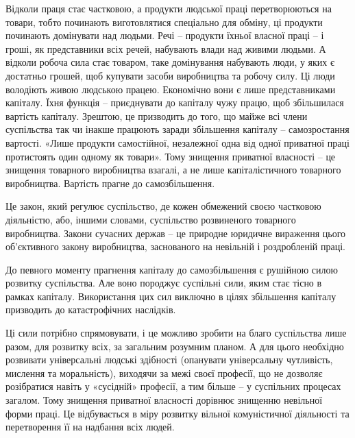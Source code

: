 \documentclass[12pt,a4paper,openany]{book}
\begin{document}
Відколи праця стає частковою, а продукти людської праці перетворюються на товари, тобто починають виготовлятися спеціально для обміну, ці продукти починають домінувати над людьми. Речі – продукти їхньої власної праці – і гроші, як представники всіх речей, набувають влади над живими людьми. А відколи робоча сила стає товаром, таке домінування набувають люди, у яких є достатньо грошей, щоб купувати засоби виробництва та робочу силу. Ці люди володіють живою людською працею. Економічно вони є лише представниками капіталу. Їхня функція – приєднувати до капіталу чужу працю, щоб збільшилася вартість капіталу. Зрештою, це призводить до того, що майже всі члени суспільства так чи інакше працюють заради збільшення капіталу – самозростання вартості. «Лише продукти самостійної, незалежної одна від одної приватної праці протистоять один одному як товари». Тому знищення приватної власності – це знищення товарного виробництва взагалі, а не лише капіталістичного товарного виробництва. Вартість прагне до самозбільшення.

Це закон, який регулює суспільство, де кожен обмежений своєю частковою діяльністю, або, іншими словами, суспільство розвиненого товарного виробництва. Закони сучасних держав – це природне юридичне вираження цього об’єктивного закону виробництва, заснованого на невільній і роздробленій праці.

До певного моменту прагнення капіталу до самозбільшення є рушійною силою розвитку суспільства. Але воно породжує суспільні сили, яким стає тісно в рамках капіталу. Використання цих сил виключно в цілях збільшення капіталу призводить до катастрофічних наслідків.

Ці сили потрібно спрямовувати, і це можливо зробити на благо суспільства лише разом, для розвитку всіх, за загальним розумним планом. А для цього необхідно розвивати універсальні людські здібності (опанувати універсальну чутливість, мислення та моральність), виходячи за межі своєї професії, що не дозволяє розібратися навіть у «сусідній» професії, а тим більше – у суспільних процесах загалом. Тому знищення приватної власності дорівнює знищенню невільної форми праці. Це відбувається в міру розвитку вільної комуністичної діяльності та перетворення її на надбання всіх людей.
\end{document}

